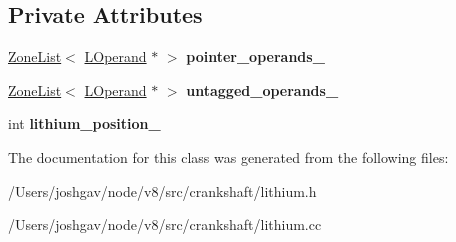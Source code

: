 \subsection*{Private Attributes}
\begin{DoxyCompactItemize}
\item 
\hyperlink{classv8_1_1internal_1_1_zone_list}{Zone\+List}$<$ \hyperlink{classv8_1_1internal_1_1_l_operand}{L\+Operand} $\ast$ $>$ {\bfseries pointer\+\_\+operands\+\_\+}\hypertarget{classv8_1_1internal_1_1_l_pointer_map_a1d3b9987e3d4565bc17161dfdd1df316}{}\label{classv8_1_1internal_1_1_l_pointer_map_a1d3b9987e3d4565bc17161dfdd1df316}

\item 
\hyperlink{classv8_1_1internal_1_1_zone_list}{Zone\+List}$<$ \hyperlink{classv8_1_1internal_1_1_l_operand}{L\+Operand} $\ast$ $>$ {\bfseries untagged\+\_\+operands\+\_\+}\hypertarget{classv8_1_1internal_1_1_l_pointer_map_ac07ce45f679526c5990fd2d718733990}{}\label{classv8_1_1internal_1_1_l_pointer_map_ac07ce45f679526c5990fd2d718733990}

\item 
int {\bfseries lithium\+\_\+position\+\_\+}\hypertarget{classv8_1_1internal_1_1_l_pointer_map_a1be9b63a5912c8c2f17992d1b5afca0d}{}\label{classv8_1_1internal_1_1_l_pointer_map_a1be9b63a5912c8c2f17992d1b5afca0d}

\end{DoxyCompactItemize}


The documentation for this class was generated from the following files\+:\begin{DoxyCompactItemize}
\item 
/\+Users/joshgav/node/v8/src/crankshaft/lithium.\+h\item 
/\+Users/joshgav/node/v8/src/crankshaft/lithium.\+cc\end{DoxyCompactItemize}

